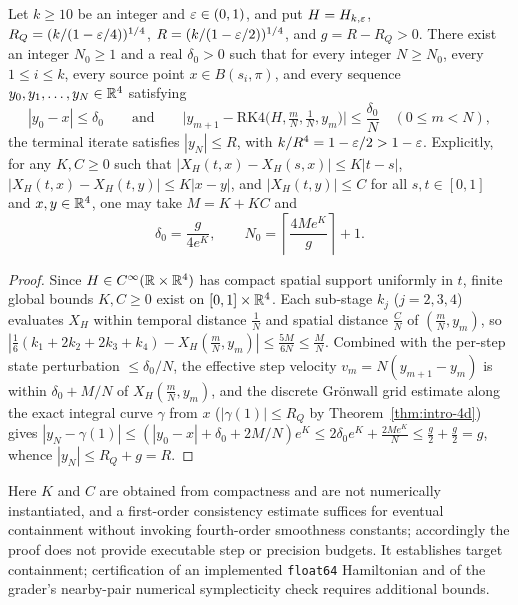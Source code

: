 \begin{maincorollary}\label{cor:rk4-containment}
Let $k\ge10$ be an integer and $\varepsilon\in(0,1)$, and put $H=H_{k,\varepsilon}$, $R_Q=(k/(1-\varepsilon/4))^{1/4}$,
$R=(k/(1-\varepsilon/2))^{1/4}$, and $g=R-R_Q>0$. There exist an integer $N_0\ge1$ and a real $\delta_0>0$ such that for every
integer $N\ge N_0$, every $1\le i\le k$, every source point $x\in B(s_i,\pi)$, and every sequence
$y_0,y_1,\dots,y_N\in\mathbb{R}^4$ satisfying
\[
 |y_0-x|\le\delta_0 \qquad\text{and}\qquad
 \bigl|y_{m+1}-\mathrm{RK4}\bigl(H,\tfrac mN,\tfrac1N,y_m\bigr)\bigr|\le\frac{\delta_0}{N}
 \quad(0\le m<N),
\]
the terminal iterate satisfies $|y_N|\le R$, with $k/R^4=1-\varepsilon/2>1-\varepsilon$. Explicitly, for any $K,C\ge0$ such that
$|X_H(t,x)-X_H(s,x)|\le K|t-s|$, $|X_H(t,x)-X_H(t,y)|\le K|x-y|$, and $|X_H(t,y)|\le C$ for all $s,t\in[0,1]$ and
$x,y\in\mathbb{R}^4$, one may take $M=K+KC$ and
\[
 \delta_0 = \frac{g}{4e^K},\qquad N_0 = \left\lceil\frac{4Me^K}{g}\right\rceil + 1.
\]
\end{maincorollary}

\begin{proof}
Since $H\in C^\infty(\mathbb{R}\times\mathbb{R}^4)$ has compact spatial support uniformly in $t$, finite global bounds $K,C\ge0$ exist
on $[0,1]\times\mathbb{R}^4$. Each sub-stage $k_j$ ($j=2,3,4$) evaluates $X_H$ within temporal distance $\frac1N$ and spatial
distance $\frac CN$ of $(\frac mN,y_m)$, so $|\frac16(k_1+2k_2+2k_3+k_4)-X_H(\frac mN,y_m)|\le\frac{5M}{6N}\le\frac MN$.
Combined with the per-step state perturbation $\le\delta_0/N$, the effective step velocity $v_m=N(y_{m+1}-y_m)$ is
within $\delta_0+M/N$ of $X_H(\frac mN,y_m)$, and the discrete Gr\"onwall grid estimate along the exact integral curve
$\gamma$ from $x$ ($|\gamma(1)|\le R_Q$ by Theorem~\ref{thm:intro-4d}) gives
$|y_N-\gamma(1)|\le(|y_0-x|+\delta_0+2M/N)e^K\le 2\delta_0e^K+\frac{2Me^K}{N}\le\frac g2+\frac g2=g$, whence
$|y_N|\le R_Q+g=R$.
\end{proof}

Here $K$ and $C$ are obtained from compactness and are not numerically instantiated, and a first-order consistency
estimate suffices for eventual containment without invoking fourth-order smoothness constants; accordingly the proof does
not provide executable step or precision budgets. It establishes target containment; certification of an implemented
\texttt{float64} Hamiltonian and of the grader's nearby-pair numerical symplecticity check requires additional bounds.

